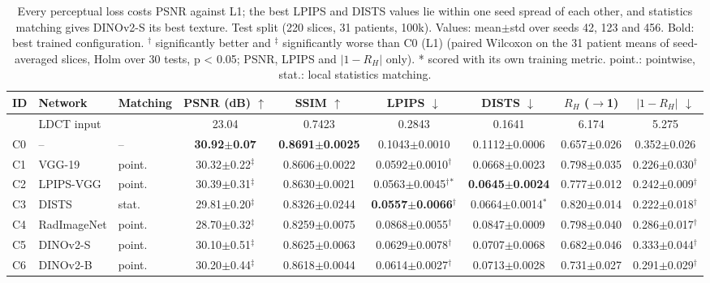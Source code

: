 \begin{table}[t]
\centering
\small
\setlength{\tabcolsep}{3pt}
\caption{Every perceptual loss costs PSNR against L1; the best LPIPS and DISTS values lie within one seed spread of each other, and statistics matching gives DINOv2-S its best texture. Test split (220 slices, 31 patients, 100k). Values: mean$\pm$std over seeds 42, 123 and 456. Bold: best trained configuration. $^{\dagger}$ significantly better and $^{\ddagger}$ significantly worse than C0 (L1) (paired Wilcoxon on the 31 patient means of seed-averaged slices, Holm over 30 tests, p < 0.05; PSNR, LPIPS and $|1-R_H|$ only). * scored with its own training metric. point.: pointwise, stat.: local statistics matching.}
\label{tab:results}
\begin{tabular}{lllcccccc}
\toprule
ID & Network & Matching & PSNR (dB) $\uparrow$ & SSIM $\uparrow$ & LPIPS $\downarrow$ & DISTS $\downarrow$ & $R_H$ ($\to$1) & $|1-R_H|$ $\downarrow$ \\
\midrule
 & LDCT input &  & 23.04 & 0.7423 & 0.2843 & 0.1641 & 6.174 & 5.275 \\
C0 & -- & -- & \textbf{30.92$\pm$0.07} & \textbf{0.8691$\pm$0.0025} & 0.1043$\pm$0.0010 & 0.1112$\pm$0.0006 & 0.657$\pm$0.026 & 0.352$\pm$0.026 \\
C1 & VGG-19 & point. & 30.32$\pm$0.22$^{\ddagger}$ & 0.8606$\pm$0.0022 & 0.0592$\pm$0.0010$^{\dagger}$ & 0.0668$\pm$0.0023 & 0.798$\pm$0.035 & 0.226$\pm$0.030$^{\dagger}$ \\
C2 & LPIPS-VGG & point. & 30.39$\pm$0.31$^{\ddagger}$ & 0.8630$\pm$0.0021 & 0.0563$\pm$0.0045$^{\dagger}${}$^{*}$ & \textbf{0.0645$\pm$0.0024} & 0.777$\pm$0.012 & 0.242$\pm$0.009$^{\dagger}$ \\
C3 & DISTS & stat. & 29.81$\pm$0.20$^{\ddagger}$ & 0.8326$\pm$0.0244 & \textbf{0.0557$\pm$0.0066}$^{\dagger}$ & 0.0664$\pm$0.0014$^{*}$ & 0.820$\pm$0.014 & 0.222$\pm$0.018$^{\dagger}$ \\
C4 & RadImageNet & point. & 28.70$\pm$0.32$^{\ddagger}$ & 0.8259$\pm$0.0075 & 0.0868$\pm$0.0055$^{\dagger}$ & 0.0847$\pm$0.0009 & 0.798$\pm$0.040 & 0.286$\pm$0.017$^{\dagger}$ \\
C5 & DINOv2-S & point. & 30.10$\pm$0.51$^{\ddagger}$ & 0.8625$\pm$0.0063 & 0.0629$\pm$0.0078$^{\dagger}$ & 0.0707$\pm$0.0068 & 0.682$\pm$0.046 & 0.333$\pm$0.044$^{\dagger}$ \\
C6 & DINOv2-B & point. & 30.20$\pm$0.44$^{\ddagger}$ & 0.8618$\pm$0.0044 & 0.0614$\pm$0.0027$^{\dagger}$ & 0.0713$\pm$0.0028 & 0.731$\pm$0.027 & 0.291$\pm$0.029$^{\dagger}$ \\

\end{tabular}
\end{table}
